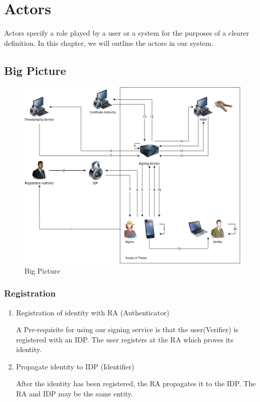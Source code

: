 \chapter{Actors}
\label{ch:actors}

Actors specify a role played by a user or a system for the purposes of a clearer definition.
In this chapter, we will outline the actors in our system.

\begin{landscape}
	\section{Big Picture}
	\begin{figure}[H]
		\begin{center}
			\includegraphics[scale=0.55]{images/BigPicture.png}
			\caption{Big Picture}
			\label{fig:bigpicture}
		\end{center}
	\end{figure}
\end{landscape}

\subsection{Registration}
\begin{enumerate}
	\item Registration of identity with \gls{RA} (Authenticator)
	
	A Pre-requisite for using our signing service is that the user(Verifier) is registered with an \gls{IDP}.
	The user registers at the \gls{RA} which proves its identity.
	
	\item Propagate identity to \gls{IDP} (Identifier)
	
	After the identity has been registered, the \gls{RA} propagates it to the \gls{IDP}.
	The \gls{RA} and \gls{IDP} may be the same entity.
\end{enumerate}

